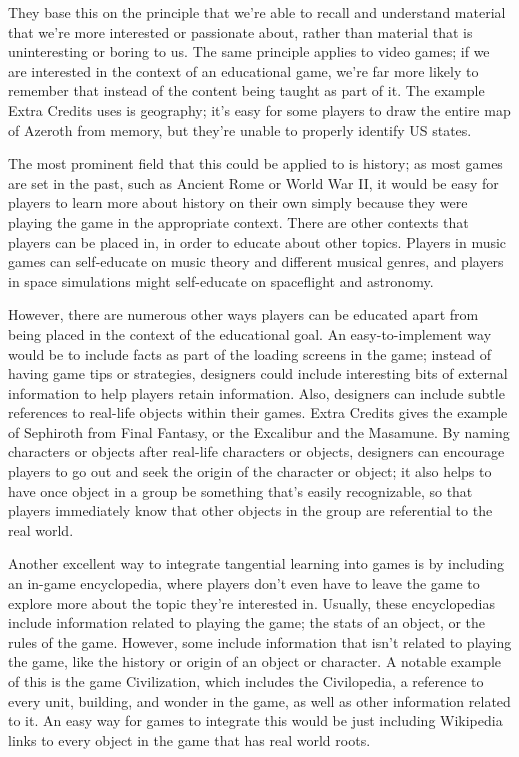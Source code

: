 \documentclass[12pt]{report}
\begin{document}
		They base this on the principle that we're able to recall and understand material that we're more interested or passionate about, rather than material that is uninteresting or boring to us. The same principle applies to video games; if we are interested in the context of an educational game, we're far more likely to remember that instead of the content being taught as part of it. The example Extra Credits uses is geography; it's easy for some players to draw the entire map of Azeroth from memory, but they're unable to properly identify US states.
		
		The most prominent field that this could be applied to is history; as most games are set in the past, such as Ancient Rome or World War II, it would be easy for players to learn more about history on their own simply because they were playing the game in the appropriate context. There are other contexts that players can be placed in, in order to educate about other topics. Players in music games can self-educate on music theory and different musical genres, and players in space simulations might self-educate on spaceflight and astronomy. 
		
		However, there are numerous other ways players can be educated apart from being placed in the context of the educational goal. An easy-to-implement way would be to include facts as part of the loading screens in the game; instead of having game tips or strategies, designers could include interesting bits of external information to help players retain information. Also, designers can include subtle references to real-life objects within their games. Extra Credits gives the example of Sephiroth from Final Fantasy, or the Excalibur and the Masamune. By naming characters or objects after real-life characters or objects, designers can encourage players to go out and seek the origin of the character or object; it also helps to have once object in a group be something that's easily recognizable, so that players immediately know that other objects in the group are referential to the real world.
		
		Another excellent way to integrate tangential learning into games is by including an in-game encyclopedia, where players don't even have to leave the game to explore more about the topic they're interested in. Usually, these encyclopedias include information related to playing the game; the stats of an object, or the rules of the game. However, some include information that isn't related to playing the game, like the history or origin of an object or character. A notable example of this is the game Civilization, which includes the Civilopedia, a reference to every unit, building, and wonder in the game, as well as other information related to it. An easy way for games to integrate this would be just including Wikipedia links to every object in the game that has real world roots.
	
\end{document}
